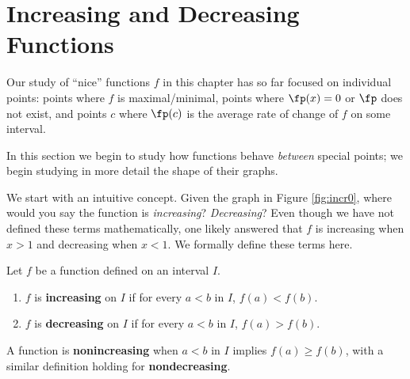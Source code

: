 \section{Increasing and Decreasing Functions}\label{sec:incr_decr}

Our study of ``nice'' functions $f$ in this chapter has so far focused on individual points: points where $f$ is maximal/minimal, points where $\fp(x) = 0$ or $\fp$ does not exist, and points $c$ where $\fp(c)$ is the average rate of change of $f$ on some interval. 

In this section we begin to study how functions behave \textit{between} special points; we begin studying in more detail the shape of their graphs. 

We start with an intuitive concept. Given the graph in Figure \ref{fig:incr0}, %
where would you say the function is \textit{increasing}? \textit{Decreasing}? Even though we have not defined these terms mathematically, one likely answered that $f$ is increasing when $x>1$ and decreasing when $x<1$. We formally define these terms here.


{Let $f$ be a function defined on an interval $I$.
\begin{enumerate}
\item		$f$ is \textbf{increasing} on $I$ if for every $a<b$ in $I$, $f(a) < f(b)$.
\item		$f$ is \textbf{decreasing} on $I$ if for every $a<b$ in $I$, $f(a) > f(b)$.
\end{enumerate}
A function is \textbf{nonincreasing} when $a<b$ in $I$ implies $f(a) \geq f(b)$, with a similar definition holding for \textbf{nondecreasing}.
}


